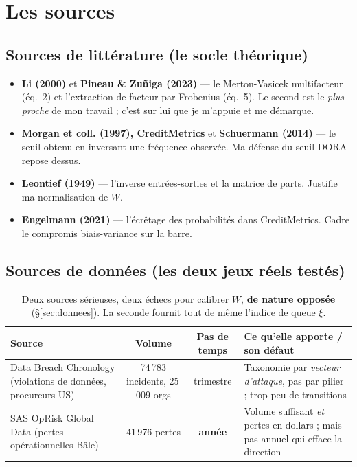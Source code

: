 \documentclass[11pt,a4paper]{article}
\begin{document}
\section{Les sources}

\subsection{Sources de littérature (le socle théorique)}

\begin{itemize}[leftmargin=1.4em,itemsep=1pt]
\item \textbf{Li (2000)} et \textbf{Pineau \& Zuñiga (2023)} --- le Merton-Vasicek multifacteur
  (éq.~2) et l'extraction de facteur par Frobenius (éq.~5). Le second est le \emph{plus proche}
  de mon travail ; c'est sur lui que je m'appuie et me démarque.
\item \textbf{Morgan et coll. (1997), CreditMetrics} et \textbf{Schuermann (2014)} --- le seuil
  obtenu en inversant une fréquence observée. Ma défense du seuil DORA repose dessus.
\item \textbf{Leontief (1949)} --- l'inverse entrées-sorties et la matrice de parts. Justifie ma
  normalisation de $W$.
\item \textbf{Engelmann (2021)} --- l'écrêtage des probabilités dans CreditMetrics. Cadre le
  compromis biais-variance sur la barre.
\end{itemize}

\subsection{Sources de données (les deux jeux réels testés)}

\begin{table}[htbp]\centering\small
\renewcommand{\arraystretch}{1.25}
\begin{tabularx}{\textwidth}{@{}>{\raggedright\arraybackslash}p{3.4cm} c c >{\raggedright\arraybackslash}X@{}}
\toprule
\textbf{Source} & \textbf{Volume} & \textbf{Pas de temps} & \textbf{Ce qu'elle apporte / son défaut} \\
\midrule
Data Breach Chronology (violations de données, procureurs US) & 74\,783 incidents, 25\,009 orgs & trimestre & Taxonomie par \emph{vecteur d'attaque}, pas par pilier ; trop peu de transitions \\
\addlinespace[2pt]
SAS OpRisk Global Data (pertes opérationnelles Bâle) & 41\,976 pertes & \textbf{année} & Volume suffisant \emph{et} pertes en dollars ; mais pas annuel qui efface la direction \\
\bottomrule
\end{tabularx}
\caption{Deux sources sérieuses, deux échecs pour calibrer $W$, \textbf{de nature opposée}
(§\ref{sec:donnees}). La seconde fournit tout de même l'indice de queue $\xi$.}
\end{table}
\end{document}
